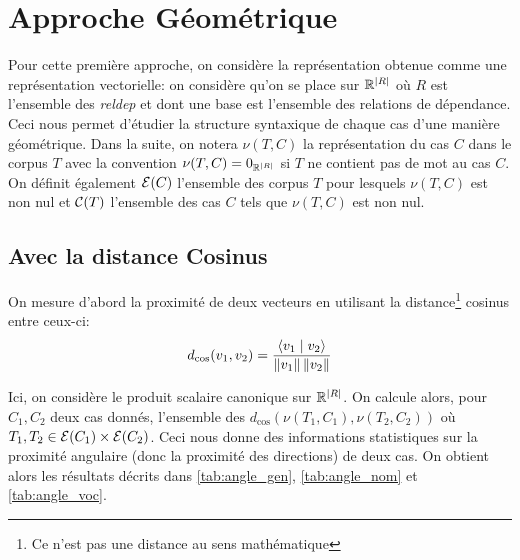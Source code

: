 \documentclass{cours}
\begin{document}
\section{Approche Géométrique}\label{sec:géométrie}
Pour cette première approche, on considère la représentation obtenue comme une représentation vectorielle: on considère qu'on se place sur $\mathbb{R}^{\left|R\right|}$ où $R$ est l'ensemble des \textit{reldep} et dont une base est l'ensemble des relations de dépendance.
Ceci nous permet d'étudier la structure syntaxique de chaque cas d'une manière géométrique.
Dans la suite, on notera $\nu(T, C)$ la représentation du cas $C$ dans le corpus $T$ avec la convention $\nu(T, C) = 0_{\mathbb{R}^{\left|R\right|}}$ si $T$ ne contient pas de mot au cas $C$.
On définit également $\mathcal{E}(C)$ l'ensemble des corpus $T$ pour lesquels $\nu(T, C)$ est non nul et $\mathcal{C}(T)$ l'ensemble des cas $C$ tels que $\nu(T, C)$ est non nul.

\subsection{Avec la distance Cosinus}\label{subsec:cosinus}
On mesure d'abord la proximité de deux vecteurs en utilisant la distance\footnote{Ce n'est pas une distance au sens mathématique} cosinus entre ceux-ci:
\begin{equation}
	d_{\cos}(v_{1},v_{2}) = \frac{\left\langle v_{1}\mid v_{2} \right\rangle}{\left\lVert v_{1} \right\rVert\left\lVert v_{2} \right\rVert}
\end{equation}

Ici, on considère le produit scalaire canonique sur $\mathbb{R}^{\left|R\right|}$.
On calcule alors, pour $C_{1}, C_{2}$ deux cas donnés, l'ensemble des $d_{\cos}\left(\nu\left(T_{1}, C_{1}\right), \nu\left(T_{2}, C_{2}\right)\right)$ où $T_{1}, T_{2} \in \mathcal{E}(C_{1})\times \mathcal{E}(C_{2})$.
Ceci nous donne des informations statistiques sur la proximité angulaire (donc la proximité des directions) de deux cas.
On obtient alors les résultats décrits dans \ref{tab:angle_gen}, \ref{tab:angle_nom} et \ref{tab:angle_voc}.
\end{document}
